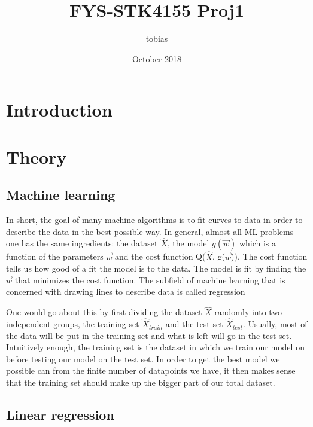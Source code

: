 \documentclass[a4paper,12pt]{article}
\title{FYS-STK4155 Proj1}
\author{tobias }
\date{October 2018}
\begin{document}
\maketitle

\section{Introduction}

\section{Theory}

\subsection{Machine learning}
In short, the goal of many machine algorithms is to fit curves to data in order to describe the data in the best possible way. In general, almost all ML-problems one has the same ingredients: the dataset $\hat{X}$, the model $g(\vec{w})$ which is a function of the parameters $\vec{w}$ and the cost function Q($\hat{X}$, g($\vec{w}$)). The cost function tells us how good of a fit the model is to the data. The model is fit by finding the $\vec{w}$ that minimizes the cost function. The subfield of machine learning that is concerned with drawing lines to describe data is called regression \newline

One would go about this by first dividing the dataset $\hat{X}$ randomly into two independent groups, the training set $\hat{X}_{train}$ and the test set $\hat{X}_{test}$. Usually, most of the data will be put in the training set and what is left will go in the test set. Intuitively enough, the training set is the dataset in which we train our model on before testing our model on the test set. In order to get the best model we possible can from the finite number of datapoints we have, it then makes sense that the training set should make up the bigger part of our total dataset.

\subsection{Linear regression}
\end{document}
